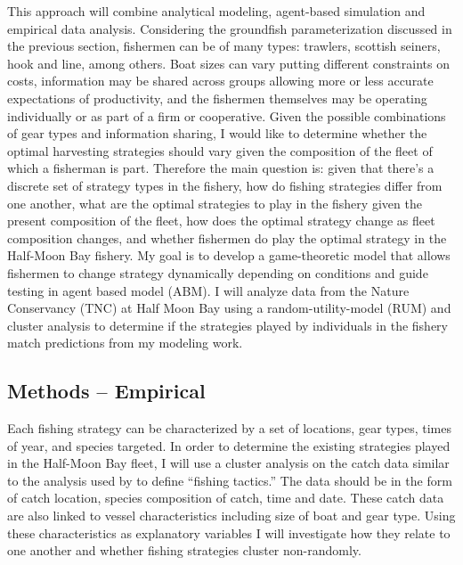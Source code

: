 \documentclass[12pt,a4paper]{report}
\begin{document}
This approach will combine analytical modeling, agent-based simulation and empirical data analysis. Considering the groundfish parameterization discussed in the previous section, fishermen can be of many types: trawlers, scottish seiners, hook and line, among others. Boat sizes can vary putting different constraints on costs, information may be shared across groups allowing more or less accurate expectations of productivity, and the fishermen themselves may be operating individually or as part of a firm or cooperative. Given the possible combinations of gear types and information sharing, I would like to determine whether the optimal harvesting strategies should vary given the composition of the fleet of which a fisherman is part. Therefore the main question is: given that there's a discrete set of strategy types in the fishery, how do fishing strategies differ from one another, what are the optimal strategies to play in the fishery given the present composition of the fleet, how does the optimal strategy change as fleet composition changes, and whether fishermen do play the optimal strategy in the Half-Moon Bay fishery. My goal is to develop a game-theoretic model that allows fishermen to change strategy dynamically depending on conditions and guide testing in agent based model (ABM). I will analyze data from the Nature Conservancy (TNC) at Half Moon Bay using a random-utility-model (RUM) and cluster analysis to determine if the strategies played by individuals in the fishery match predictions from my modeling work.

\subsection{Methods -- Empirical}
Each fishing strategy can be characterized by a set of locations, gear types, times of year, and species targeted. In order to determine the existing strategies played in the Half-Moon Bay fleet, I will use a cluster analysis on the catch data similar to the analysis used by \cite{PelletierFerraris:2000} to define ``fishing tactics.'' The data should be in the form of catch location, species composition of catch, time and date. These catch data are also linked to vessel characteristics including size of boat and gear type. Using these characteristics as explanatory variables I will investigate how they relate to one another and whether fishing strategies cluster non-randomly. 
\end{document}

